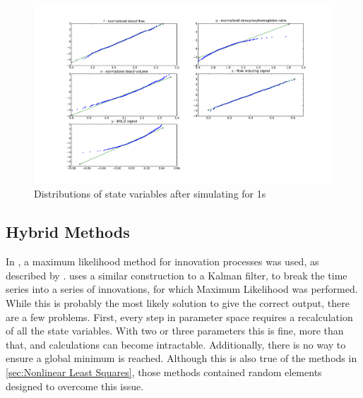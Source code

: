 \begin{figure}
\includegraphics[trim=6cm .75cm 6cm .75cm,width=16cm]{images/gauss_step_1sec_3sigma.pdf}
\caption{Distributions of state variables after simulating for 1s}
\label{fig:trans1s}
\end{figure}

\subsection{Hybrid Methods}
In \cite{Riera2004}, a maximum
likelihood method for innovation processes was used, as described by
\cite{Ozaki1994}. \cite{Ozaki1994} uses a similar construction to a 
Kalman filter, to break the time series into a series of innovations,
for which Maximum Likelihood was performed. While this is probably the most
likely solution to give the correct output, there are a few problems. First, every
step in parameter space requires a recalculation of all the state variables. With
two or three parameters this is fine, more than that, and calculations can become
intractable. Additionally, there is no way to ensure a global minimum is reached.
Although this is also true of the methods in \autoref{sec:Nonlinear Least Squares},
those methods contained random elements designed to overcome this issue.


